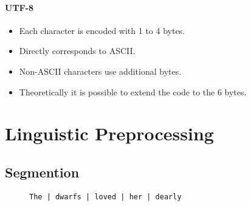 \documentclass[a4paper, 11pt, accentcolor = tud3b]{tudreport}
\begin{document}
                \subsubsection{UTF-8} %
                    \begin{itemize}
                    	\item Each character is encoded with 1 to 4 bytes.
                    	\item Directly corresponds to ASCII.
                    	\item Non-ASCII characters use additional bytes.
                    	\item Theoretically it is possible to extend the code to the 6 bytes.
                    \end{itemize}

    \chapter{Linguistic Preprocessing} %
    	\label{c:linguistic_preprocessing}

        \section{Segmention} %
        	\begin{figure}[H]
        		\centering
        		\texttt{The | dwarfs | loved | her | dearly}
        	\end{figure}
\end{document}
